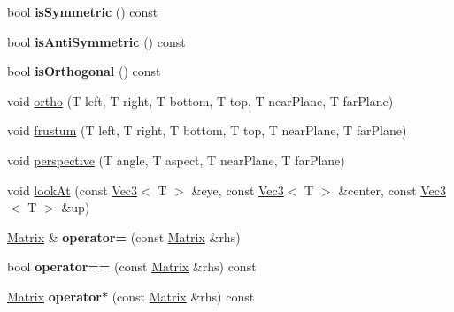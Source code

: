 \begin{DoxyCompactItemize}
\item 
\hypertarget{classps_1_1base_1_1Matrix_ad575164185c43b844379f61a0aaf095e}{}bool {\bfseries is\+Symmetric} () const \label{classps_1_1base_1_1Matrix_ad575164185c43b844379f61a0aaf095e}

\item 
\hypertarget{classps_1_1base_1_1Matrix_a15201d6857361d80dbffb92cf35d6137}{}bool {\bfseries is\+Anti\+Symmetric} () const \label{classps_1_1base_1_1Matrix_a15201d6857361d80dbffb92cf35d6137}

\item 
\hypertarget{classps_1_1base_1_1Matrix_ab56ac07258ab43bc020096d1077752c4}{}bool {\bfseries is\+Orthogonal} () const \label{classps_1_1base_1_1Matrix_ab56ac07258ab43bc020096d1077752c4}

\item 
void \hyperlink{classps_1_1base_1_1Matrix_a74291a5041073a416fa4cc80d9bbe800}{ortho} (T left, T right, T bottom, T top, T near\+Plane, T far\+Plane)
\item 
void \hyperlink{classps_1_1base_1_1Matrix_aeb30067f0c86709286708bbad6e4d6b2}{frustum} (T left, T right, T bottom, T top, T near\+Plane, T far\+Plane)
\item 
void \hyperlink{classps_1_1base_1_1Matrix_a23c1013597d2faaad6f4065a1f90885e}{perspective} (T angle, T aspect, T near\+Plane, T far\+Plane)
\item 
void \hyperlink{classps_1_1base_1_1Matrix_ab0d2e489dadca9cd3478ad713a1c95dd}{look\+At} (const \hyperlink{classps_1_1base_1_1Vec3}{Vec3}$<$ T $>$ \&eye, const \hyperlink{classps_1_1base_1_1Vec3}{Vec3}$<$ T $>$ \&center, const \hyperlink{classps_1_1base_1_1Vec3}{Vec3}$<$ T $>$ \&up)
\item 
\hypertarget{classps_1_1base_1_1Matrix_aa87d5c8114e4018660d51fea36ebfe9c}{}\hyperlink{classps_1_1base_1_1Matrix}{Matrix} \& {\bfseries operator=} (const \hyperlink{classps_1_1base_1_1Matrix}{Matrix} \&rhs)\label{classps_1_1base_1_1Matrix_aa87d5c8114e4018660d51fea36ebfe9c}

\item 
\hypertarget{classps_1_1base_1_1Matrix_a9a7a5ec5c1ab671427fb7f7fe4a55f7c}{}bool {\bfseries operator==} (const \hyperlink{classps_1_1base_1_1Matrix}{Matrix} \&rhs) const \label{classps_1_1base_1_1Matrix_a9a7a5ec5c1ab671427fb7f7fe4a55f7c}

\item 
\hypertarget{classps_1_1base_1_1Matrix_a4b3c67c4330df488d5cb066075cebb3a}{}\hyperlink{classps_1_1base_1_1Matrix}{Matrix} {\bfseries operator$\ast$} (const \hyperlink{classps_1_1base_1_1Matrix}{Matrix} \&rhs) const \label{classps_1_1base_1_1Matrix_a4b3c67c4330df488d5cb066075cebb3a}


\end{DoxyCompactItemize}
